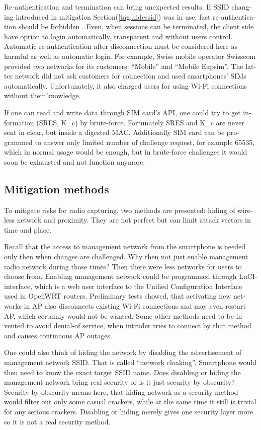 \documentclass[12pt,a4paper,english]{tutthesis}
\begin{document}
\begin{otherlanguage}{english}
Re-authentication and termination can bring unexpected results.
If SSID changing introduced in mitigation Section(\ref{tag:hidessid}) was in use, fast re-authentication
should be forbidden \cite[p.11]{rfc5448}.
Even, when sessions can be terminated, the client side have 
option to login automatically, transparent and without users control.
Automatic re-authentication after disconnection  must be considered
here as harmful as well as automatic login. For example,
Swiss mobile operator Swisscom provided two networks for its customers:
``Mobile'' and ``Mobile Eapsim''. The latter network did not ask customers
for connection and used smartphones' SIMs automatically. Unfortunately,
it also charged users for using Wi-Fi connections without their 
knowledge.\cite{swisscom}





If one can read and write data through SIM card's API,
one could try to get information (SRES, K\_c) by brute-force. 
Fortunately SRES and K\_c are never sent in clear, but inside
a digested MAC.
 Additionally SIM card can be programmed to answer only
limited number of challenge request, for example 65535, which in
normal usage would be enough, but in brute-force challenges 
it would soon be exhausted and not function anymore.


\subsection{Mitigation methods}
\label{sec-6-5-6}
To mitigate risks for radio capturing, two methods are presented: hiding of
wireless network and proximity. They are not perfect but can
limit attack vectors in time and place.


Recall that the access to management network from the smartphone is
 needed only then when changes
are challenged. Why then not just enable management radio network
during those times? Then there were less networks for users to choose from.
Enabling management network could be programmed through 
LuCI-interface, which is a web user interface to the Unified
 Configuration Interface used in OpenWRT routers.
Preliminary tests showed, that activating new networks in AP also 
disconnects existing Wi-Fi connections and may even restart AP,
which certainly would not be wanted. Some other methods need to
be invented to avoid denial-of service, when intruder tries to 
connect by that method and causes continuous AP outages.

\label{tag:hidessid}
One could also think of hiding the network by disabling the
advertisement of management network SSID. That is called ``network
cloaking''.  Smartphone would then need to know the exact target SSID name.
Does disabling or hiding the management network bring real security or
is it just security by obscurity?  Security by obscurity means here,
that hiding network 
as a security method would filter out only some casual crackers, while
at the same time it still is trivial for any serious crackers.
Disabling or hiding  merely gives one security layer more so it is not
a real security method.


\end{otherlanguage}
\end{document}
